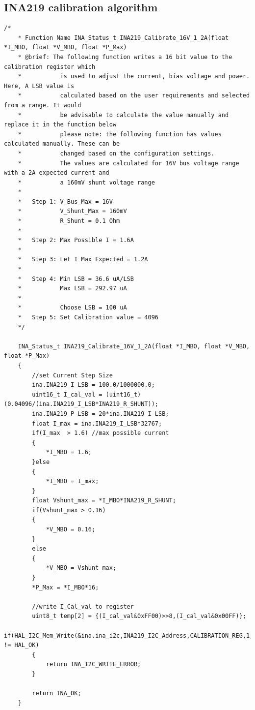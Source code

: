 \subsection{INA219 calibration algorithm}
\begin{lstlisting}[breaklines=true]
	/*
	* Function Name INA_Status_t INA219_Calibrate_16V_1_2A(float *I_MBO, float *V_MBO, float *P_Max)
	* @brief: The following function writes a 16 bit value to the calibration register which
	* 			is used to adjust the current, bias voltage and power. Here, A LSB value is
	* 			calculated based on the user requirements and selected from a range. It would
	* 			be advisable to calculate the value manually and replace it in the function below
	* 			please note: the following function has values calculated manually. These can be
	* 			changed based on the configuration settings.
	* 			The values are calculated for 16V bus voltage range with a 2A expected current and
	* 			a 160mV shunt voltage range
	*
	* 	Step 1: V_Bus_Max = 16V
	* 			V_Shunt_Max = 160mV
	* 			R_Shunt = 0.1 Ohm
	*
	* 	Step 2: Max Possible I = 1.6A
	*
	* 	Step 3: Let I Max Expected = 1.2A
	*
	* 	Step 4: Min LSB = 36.6 uA/LSB
	* 			Max LSB = 292.97 uA
	*
	* 			Choose LSB = 100 uA
	* 	Step 5: Set Calibration value = 4096
	*/
	
	INA_Status_t INA219_Calibrate_16V_1_2A(float *I_MBO, float *V_MBO, float *P_Max)
	{
		//set Current Step Size
		ina.INA219_I_LSB = 100.0/1000000.0;
		uint16_t I_cal_val = (uint16_t)(0.04096/(ina.INA219_I_LSB*INA219_R_SHUNT));
		ina.INA219_P_LSB = 20*ina.INA219_I_LSB;
		float I_max = ina.INA219_I_LSB*32767;
		if(I_max  > 1.6) //max possible current
		{
			*I_MBO = 1.6;
		}else
		{
			*I_MBO = I_max;
		}
		float Vshunt_max = *I_MBO*INA219_R_SHUNT;
		if(Vshunt_max > 0.16)
		{
			*V_MBO = 0.16;
		}
		else
		{
			*V_MBO = Vshunt_max;
		}
		*P_Max = *I_MBO*16;
		
		//write I_Cal_val to register
		uint8_t temp[2] = {(I_cal_val&0xFF00)>>8,(I_cal_val&0x00FF)};
		if(HAL_I2C_Mem_Write(&ina.ina_i2c,INA219_I2C_Address,CALIBRATION_REG,1,temp,2,100) != HAL_OK)
		{
			return INA_I2C_WRITE_ERROR;
		}
		
		return INA_OK;
	}
	
\end{lstlisting}
\begin{center}
	\captionsetup{type=figure}
	\label{fig:INA_Calib}
\end{center}

